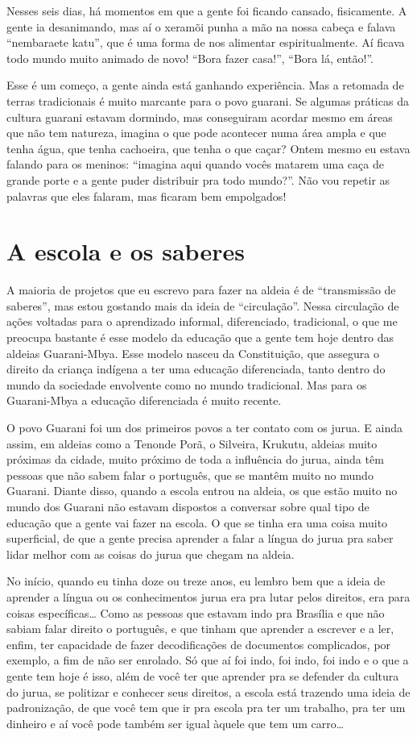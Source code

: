 Nesses seis dias, há momentos em que a gente foi ficando cansado,
fisicamente. A gente ia desanimando, mas aí o xeramõi punha a mão na
nossa cabeça e falava ``nembaraete katu'', que é uma forma de nos
alimentar espiritualmente. Aí ficava todo mundo muito animado de novo!
``Bora fazer casa!'', ``Bora lá, então!''. 

Esse é um começo, a gente ainda está ganhando experiência. Mas a
retomada de terras tradicionais é muito marcante para o povo guarani.
Se algumas práticas da cultura guarani estavam dormindo, mas
conseguiram acordar mesmo em áreas que não tem natureza, imagina o que
pode acontecer numa área ampla e que tenha água, que tenha cachoeira,
que tenha o que caçar? Ontem mesmo eu estava falando para os meninos:
``imagina aqui quando vocês matarem uma caça de grande porte e a gente
puder distribuir pra todo mundo?''. Não vou repetir as palavras que eles
falaram, mas ficaram bem empolgados!

\section{A escola e os saberes}

A maioria de projetos que eu escrevo para fazer na aldeia é de
``transmissão de saberes'', mas estou gostando mais da ideia de
``circulação''. Nessa circulação de ações voltadas para o aprendizado
informal, diferenciado, tradicional, o que me preocupa bastante é esse
modelo da educação que a gente tem hoje dentro das aldeias
Guarani-Mbya. Esse modelo nasceu da Constituição, que assegura o
direito da criança indígena a ter uma educação diferenciada, tanto
dentro do mundo da sociedade envolvente como no mundo tradicional. Mas
para os Guarani-Mbya a educação diferenciada é muito recente.

O povo Guarani foi um dos primeiros povos a ter contato com os jurua. E
ainda assim, em aldeias como a Tenonde Porã, o Silveira, Krukutu,
aldeias muito próximas da cidade, muito próximo de toda a influência do
jurua, ainda têm pessoas que não sabem falar o português, que se mantêm
muito no mundo Guarani. Diante disso, quando a escola entrou na aldeia,
os que estão muito no mundo dos Guarani não estavam dispostos a
conversar sobre qual tipo de educação que a gente vai fazer na escola.
O que se tinha era uma coisa muito superficial, de que a gente precisa
aprender a falar a língua do jurua pra saber lidar melhor com as coisas
do jurua que chegam na aldeia. 

No início, quando eu tinha doze ou treze anos, eu lembro bem que a ideia
de aprender a língua ou os conhecimentos jurua era pra lutar pelos
direitos, era para coisas específicas\ldots{} Como as pessoas que estavam
indo pra Brasília e que não sabiam falar direito o português, e que
tinham que aprender a escrever e a ler, enfim, ter capacidade de fazer
decodificações de documentos complicados, por exemplo, a fim de não ser
enrolado. Só que aí foi indo, foi indo, foi indo e o que a gente tem
hoje é isso, além de você ter que aprender pra se defender da cultura
do jurua, se politizar e conhecer seus direitos, a escola está trazendo
uma ideia de padronização, de que você tem que ir pra escola pra ter um
trabalho, pra ter um dinheiro e aí você pode também ser igual àquele
que tem um carro\ldots{}


